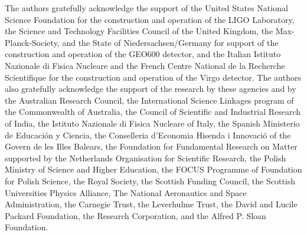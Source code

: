 The authors gratefully acknowledge the support of the United States
National Science Foundation for the construction and operation of the
LIGO Laboratory, the Science and Technology Facilities Council of the
United Kingdom, the Max-Planck-Society, and the State of
Niedersachsen/Germany for support of the construction and operation of
the GEO600 detector, and the Italian Istituto Nazionale di Fisica
Nucleare and the French Centre National de la Recherche Scientifique
for the construction and operation of the Virgo detector. The authors
also gratefully acknowledge the support of the research by these
agencies and by the Australian Research Council, 
the International Science Linkages program of the Commonwealth of Australia,
the Council of Scientific and Industrial Research of India, 
the Istituto Nazionale di Fisica Nucleare of Italy, 
the Spanish Ministerio de Educaci\'on y Ciencia, 
the Conselleria d'Economia Hisenda i Innovaci\'o of the
Govern de les Illes Balears, the Foundation for Fundamental Research
on Matter supported by the Netherlands Organisation for Scientific Research, 
the Polish Ministry of Science and Higher Education, the FOCUS
Programme of Foundation for Polish Science,
the Royal Society, the Scottish Funding Council, the
Scottish Universities Physics Alliance, The National Aeronautics and
Space Administration, the Carnegie Trust, the Leverhulme Trust, the
David and Lucile Packard Foundation, the Research Corporation, and
the Alfred P. Sloan Foundation.